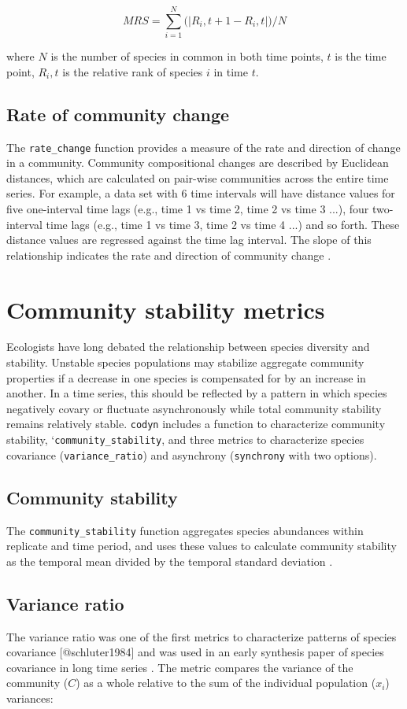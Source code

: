 \documentclass[11pt]{article}
\begin{document}
$$ MRS = {\sum_{i=1}^{N} (|R_i,t+1 - R_i,t|})/N $$

where $N$ is the number of species in common in both time points, $t$ is the time point, $R_i,t$ is the relative rank of species $i$ in time $t$.

\subsection{Rate of community change}
The \texttt{rate\_change} function provides a measure of the rate and direction of change in a community. Community compositional changes are described by Euclidean distances, which are calculated on pair-wise communities across the entire time series. For example, a data set with 6 time intervals will have distance values for five one-interval time lags (e.g., time 1 vs time 2, time 2 vs time 3 ...), four two-interval time lags (e.g., time 1 vs time 3, time 2 vs time 4 ...) and so forth. These distance values are regressed against the time lag interval. The slope of this relationship indicates the rate and direction of community change \cite{collins2000}.

\section{Community stability metrics}
Ecologists have long debated the relationship between species diversity and stability. Unstable species populations may stabilize aggregate community properties if a decrease in one species is compensated for by an increase in another. In a time series, this should be reflected by a pattern in which species negatively covary or fluctuate asynchronously while total community stability remains relatively stable. \texttt{codyn} includes a function to characterize community stability, `\texttt{community\_stability}, and three metrics to characterize species covariance (\texttt{variance\_ratio}) and asynchrony (\texttt{synchrony} with two options).

\subsection{ Community stability}
The \texttt{community\_stability} function aggregates species abundances within replicate and time period, and uses these values to calculate community stability as the temporal mean divided by the temporal standard deviation \cite{tilman1999}.

\subsection{Variance ratio}
The variance ratio was one of the first metrics to characterize patterns of species covariance [@schluter1984] and was used in an early synthesis paper of species covariance in long time series \cite{houlahan2007}. The metric compares the variance of the community ($C$) as a whole relative to the sum of the individual population ($x_i$) variances:
\end{document}
